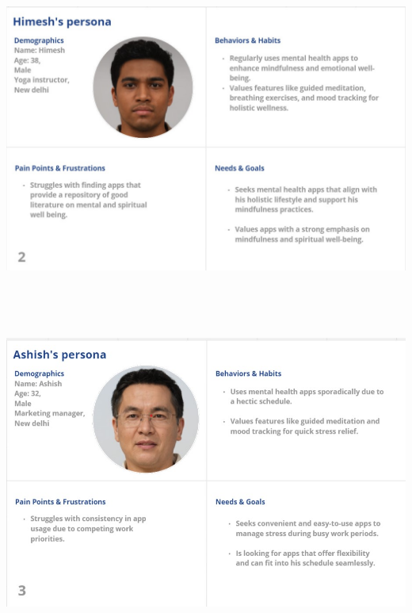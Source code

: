 \documentclass[manuscript,screen,review]{acmart}
\begin{document}
    \includegraphics[width=6.26806in,height=4.15764in]{vertopal.com_Personas/vertopal_68c5e293405b4e92b3a0f3d4afe53fc3/media/image2.jpeg}



    \includegraphics[width=6.26806in,height=4.22222in]{vertopal.com_Personas/vertopal_68c5e293405b4e92b3a0f3d4afe53fc3/media/image3.jpeg}
\end{document}

